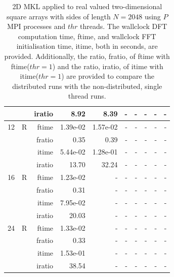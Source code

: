 \documentclass[a4paper]{article}
\begin{document}
\begin{table}[htbp]
\begin{center}
\begin{small}
\begin{tabular}{|r|r|r|r|r|r|r|r|r|r|}
          &      & iratio & 8.92 & 8.39 &     -     &     -     &     -     &     -     &     -     \\ \hline 
     12 & R & ftime & 1.39e-02 & 1.57e-02 &     -     &     -     &     -     &     -     &     -     \\   
          &      & fratio & 0.35 & 0.39 &     -     &     -     &     -     &     -     &     -     \\   
          &      & itime & 5.44e-02 & 1.28e-01 &     -     &     -     &     -     &     -     &     -     \\   
          &      & iratio & 13.70 & 32.24 &     -     &     -     &     -     &     -     &     -     \\ \hline 
     16 & R & ftime & 1.23e-02 &     -     &     -     &     -     &     -     &     -     &     -     \\   
          &      & fratio & 0.31 &     -     &     -     &     -     &     -     &     -     &     -     \\   
          &      & itime & 7.95e-02 &     -     &     -     &     -     &     -     &     -     &     -     \\   
          &      & iratio & 20.03 &     -     &     -     &     -     &     -     &     -     &     -     \\ \hline 
     24 & R & ftime & 1.33e-02 &     -     &     -     &     -     &     -     &     -     &     -     \\   
          &      & fratio & 0.33 &     -     &     -     &     -     &     -     &     -     &     -     \\   
          &      & itime & 1.53e-01 &     -     &     -     &     -     &     -     &     -     &     -     \\   
          &      & iratio & 38.54 &     -     &     -     &     -     &     -     &     -     &     -     \\ \hline 


\end{tabular}
\caption{2D MKL applied to real valued two-dimensional square arrays with sides of length $N=2048$ using $P$ MPI processes and $thr$ threads. The wallclock DFT computation time, ftime, and wallclock FFT initialisation time, itime, both in seconds, are provided. Additionally, the ratio, fratio, of ftime  with ftime($thr=1$) and the ratio, iratio, of itime  with itime($thr=1$) are provided to compare the distributed runs with the non-distributed, single thread runs.  }\label{TblMKL2d2048}
\end{small}
\end{center}
\end{table}
\end{document}
